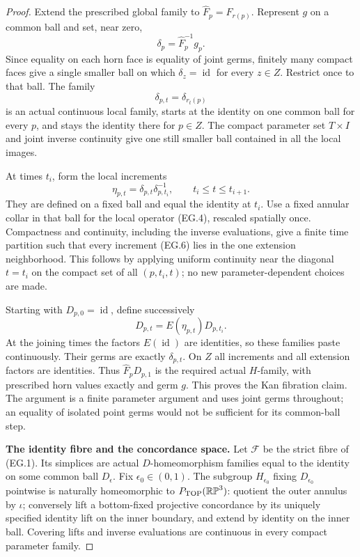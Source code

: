 \begin{proof}
Extend the prescribed global family to $\widehat F_p=F_{r(p)}$.
Represent $g$ on a common ball and set, near zero,
\[
 \delta_p=\widehat F_p^{-1}g_p.
\]
Since equality on each horn face is equality of joint germs, finitely
many compact faces give a single smaller ball on which
$\delta_z=\operatorname{id}$ for every $z\in Z$. Restrict once to that
ball. The family
\[
 \delta_{p,t}=\delta_{r_t(p)}
 \tag{EG.5}
\]
is an actual continuous local family, starts at the identity on one
common ball for every $p$, and stays the identity there for $p\in Z$.
The compact parameter set $T\times I$ and joint inverse continuity give
one still smaller ball contained in all the local images.

At times $t_i$, form the local increments
\[
 \eta_{p,t}=\delta_{p,t}\delta_{p,t_i}^{-1},
       \qquad t_i\le t\le t_{i+1}.
 \tag{EG.6}
\]
They are defined on a fixed ball and equal the identity at $t_i$.
Use a fixed annular collar in that ball for the local operator (EG.4),
rescaled spatially once. Compactness and continuity, including the
inverse evaluations, give a finite time partition such that every
increment (EG.6) lies in the one extension neighborhood. This follows
by applying uniform continuity near the diagonal $t=t_i$ on the compact
set of all $(p,t_i,t)$; no new parameter-dependent choices are made.

Starting with $D_{p,0}=\operatorname{id}$, define successively
\[
 D_{p,t}=E(\eta_{p,t})D_{p,t_i}.
 \tag{EG.7}
\]
At the joining times the factors $E(\operatorname{id})$ are identities,
so these families paste continuously. Their germs are exactly
$\delta_{p,t}$. On $Z$ all increments and all extension factors are
identities. Thus $\widehat F_pD_{p,1}$ is the required actual $H$-family,
with prescribed horn values exactly and germ $g$. This proves the Kan
fibration claim. The argument is a finite parameter argument and uses
joint germs throughout; an equality of isolated point germs would not
be sufficient for its common-ball step.

\textbf{The identity fibre and the concordance space.}\quad
Let $\mathcal F$ be the strict fibre of (EG.1). Its simplices are actual
$D$-homeomorphism families equal to the identity on some common ball
$D_\epsilon$. Fix $\epsilon_0\in(0,1)$. The subgroup $H_{\epsilon_0}$
fixing $D_{\epsilon_0}$ pointwise is naturally homeomorphic to
$P_{\rm TOP}(\mathbb {RP}^3)$: quotient the outer annulus by $\iota$;
conversely lift a bottom-fixed projective concordance by its uniquely
specified identity lift on the inner boundary, and extend by identity
on the inner ball. Covering lifts and inverse evaluations are continuous
in every compact parameter family.


\end{proof}
